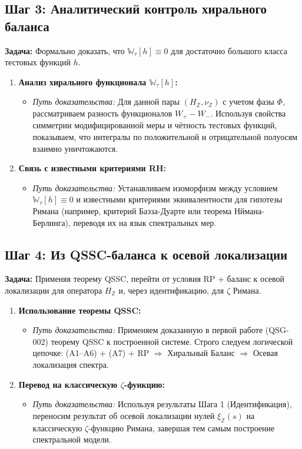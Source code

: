 \documentclass{article}
\numberwithin{equation}{section}
\theoremstyle{plain}
\theoremstyle{definition}
\theoremstyle{remark}
\begin{document}
\subsection*{Шаг 3: Аналитический контроль хирального баланса}
\textbf{Задача:} Формально доказать, что $\mathbb{W}_\tau[h] \equiv 0$ для достаточно большого класса тестовых функций $h$.
\begin{enumerate}
    \item \textbf{Анализ хирального функционала $\mathbb{W}_\tau[h]$:}
    \begin{itemize}
        \item \emph{Путь доказательства:} Для данной пары $(H_{\mathbb{Z}}, \nu_{\mathbb{Z}})$ с учетом фазы $\Phi$, рассматриваем разность функционалов $W_+ - W_-$. Используя свойства симметрии модифицированной меры и чётность тестовых функций, показываем, что интегралы по положительной и отрицательной полуосям взаимно уничтожаются.
    \end{itemize}
    \item \textbf{Связь с известными критериями RH:}
    \begin{itemize}
        \item \emph{Путь доказательства:} Устанавливаем изоморфизм между условием $\mathbb{W}_\tau[h] \equiv 0$ и известными критериями эквивалентности для гипотезы Римана (например, критерий Баэза-Дуарте или теорема Нймана-Берлинга), переводя их на язык спектральных мер.
    \end{itemize}
\end{enumerate}

\subsection*{Шаг 4: Из QSSC-баланса к осевой локализации}
\textbf{Задача:} Применяя теорему QSSC, перейти от условия RP + баланс к осевой локализации для оператора $H_{\mathbb{Z}}$ и, через идентификацию, для $\zeta$ Римана.
\begin{enumerate}
    \item \textbf{Использование теоремы QSSC:}
    \begin{itemize}
        \item \emph{Путь доказательства:} Применяем доказанную в первой работе (QSG-002) теорему QSSC к построенной системе. Строго следуем логической цепочке: (A1–A6) + (A7) + RP $\Longrightarrow$ Хиральный Баланс $\Longrightarrow$ Осевая локализация спектра.
    \end{itemize}
    \item \textbf{Перевод на классическую $\zeta$-функцию:}
    \begin{itemize}
        \item \emph{Путь доказательства:} Используя результаты Шага 1 (Идентификация), переносим результат об осевой локализации нулей $\xi_{\mathbb{Z}}(s)$ на классическую $\zeta$-функцию Римана, завершая тем самым построение спектральной модели.
    \end{itemize}
\end{enumerate}
\end{document}
